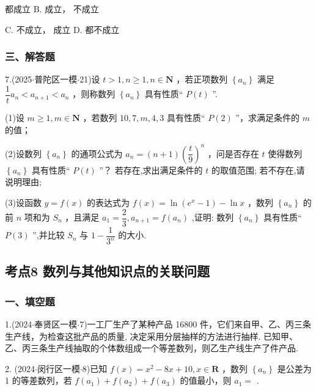 \xx{}{}{}{}    都成立 B.   成立，  不成立

C.   不成立，  成立 D.     都不成立

\subsubsection*{三、解答题}

7.(2025$\cdot$普陀区一模$\cdot$21)设 $t > 1,n \geq  1,n \in  \mathbf{N}$ ，若正项数列 $\left\{  {a}_{n}\right\}$ 满足 $\dfrac{1}{t}{a}_{n} < {a}_{n + 1} < {a}_{n}$ ，则称数列 $\left\{  {a}_{n}\right\}$ 具有性质“ $P\left( t\right)$ ”.

(1)设 $m \geq  1,m \in  \mathbf{N}$ ，若数列 ${10},7,m,4,3$ 具有性质“ $P\left( 2\right)$ ”，求满足条件的 $m$ 的值；

(2)设数列 $\left\{  {a}_{n}\right\}$ 的通项公式为 ${a}_{n} = \left( {n + 1}\right) {\left( \dfrac{t}{9}\right) }^{n}$ ，问是否存在 $t$ 使得数列 $\left\{  {a}_{n}\right\}$ 具有性质“ $P\left( t\right)$ ”？ 若存在,求出满足条件的 $t$ 的取值范围; 若不存在,请说明理由;

(3)设函数 $y = f\left( x\right)$ 的表达式为 $f\left( x\right)  = \ln \left( {{{e}}^{x} - 1}\right)  - \ln x$ ，数列 $\left\{  {a}_{n}\right\}$ 的前 $n$ 项和为 ${S}_{n}$ ，且满足 ${a}_{1} = \dfrac{2}{3},{a}_{n + 1} = f\left( {a}_{n}\right)$ ,证明: 数列 $\left\{  {a}_{n}\right\}$ 具有性质“ $P\left( 3\right)$ ”,并比较 ${S}_{n}$ 与 $1 - \dfrac{1}{{3}^{n}}$ 的大小.

\subsection*{考点8 数列与其他知识点的关联问题}

\subsubsection*{一、填空题}

1.(2024$\cdot$奉贤区一模$\cdot$7)一工厂生产了某种产品 16800 件，它们来自甲、乙、丙三条生产线，为检查这批产品的质量, 决定采用分层抽样的方法进行抽样. 已知甲、乙、丙三条生产线抽取的个体数组成一个等差数列，则乙生产线生产了\blkda[2]{}件产品.

2. (2024$\cdot$闵行区一模$\cdot$8)已知 $f\left( x\right)  = {x}^{2} - {8x} + {10},x \in  \mathbf{R}$ ，数列 $\left\{  {a}_{n}\right\}$ 是公差为 1 的等差数列，若 $f\left( {a}_{1}\right)  + f\left( {a}_{2}\right)  + f\left( {a}_{3}\right)$ 的值最小，则 ${a}_{1} =$ \blkda[2]{}.

